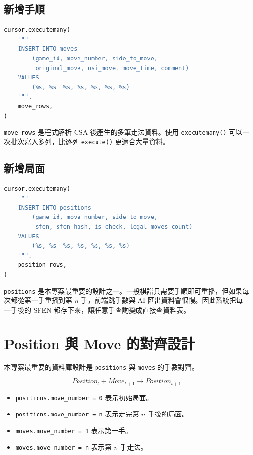 \documentclass[12pt,a4paper,fontset=none]{ctexart}
\begin{document}
\subsection{新增手順}

\begin{lstlisting}[style=pystyle,language=Python]
cursor.executemany(
    """
    INSERT INTO moves
        (game_id, move_number, side_to_move,
         original_move, usi_move, move_time, comment)
    VALUES
        (%s, %s, %s, %s, %s, %s, %s)
    """,
    move_rows,
)
\end{lstlisting}

\texttt{move\_rows} 是程式解析 CSA 後產生的多筆走法資料。使用 \texttt{executemany()} 可以一次批次寫入多列，比逐列 \texttt{execute()} 更適合大量資料。

\subsection{新增局面}

\begin{lstlisting}[style=pystyle,language=Python]
cursor.executemany(
    """
    INSERT INTO positions
        (game_id, move_number, side_to_move,
         sfen, sfen_hash, is_check, legal_moves_count)
    VALUES
        (%s, %s, %s, %s, %s, %s, %s)
    """,
    position_rows,
)
\end{lstlisting}

\texttt{positions} 是本專案最重要的設計之一。一般棋譜只需要手順即可重播，但如果每次都從第一手重播到第 $n$ 手，前端跳手數與 AI 匯出資料會很慢。因此系統把每一手後的 SFEN 都存下來，讓任意手查詢變成直接查資料表。

\section{Position 與 Move 的對齊設計}

本專案最重要的資料庫設計是 \texttt{positions} 與 \texttt{moves} 的手數對齊。

\[
Position_t + Move_{t+1} \rightarrow Position_{t+1}
\]

\begin{itemize}
  \item \texttt{positions.move\_number = 0} 表示初始局面。
  \item \texttt{positions.move\_number = n} 表示走完第 $n$ 手後的局面。
  \item \texttt{moves.move\_number = 1} 表示第一手。
  \item \texttt{moves.move\_number = n} 表示第 $n$ 手走法。
\end{itemize}
\end{document}
